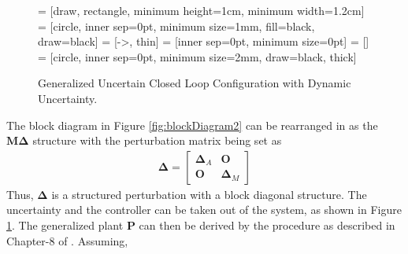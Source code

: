 \begin{figure}[h!]
  \centering
       = [draw, rectangle, minimum height=1cm, minimum width=1.2cm]
        = [circle, inner sep=0pt, minimum size=1mm, fill=black, draw=black]
     = [->, thin]
         = [inner sep=0pt, minimum size=0pt]
         = []
           = [circle, inner sep=0pt, minimum size=2mm, draw=black, thick]
	  \caption{Generalized Uncertain Closed Loop Configuration with Dynamic Uncertainty.}
    \label{fig:blockDiagram3}
\end{figure}
The block diagram in Figure \ref{fig:blockDiagram2} can be rearranged in as the $\mathbf{M\Delta}$ structure with the perturbation matrix being set as
\begin{align*}
    \mathbf{\Delta} = 
    \begin{bmatrix}
        \mathbf{\Delta}_A & \mathbf{O}\\
        \mathbf{O} & \mathbf{\Delta}_M
    \end{bmatrix}
\end{align*}
Thus, $\mathbf{\Delta}$ is a structured perturbation with a block diagonal structure. 
The uncertainty and the controller can be taken out of the system, as shown in Figure \ref{fig:blockDiagram3}. The generalized plant $\mathbf{P}$ can then be derived by the procedure as described in Chapter-8 of \cite{Sko05}. Assuming,
